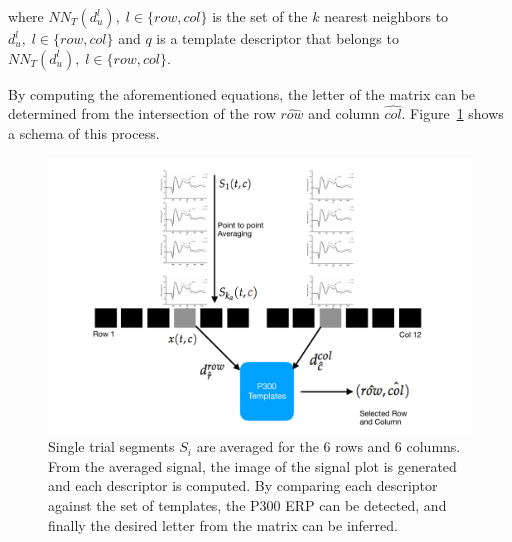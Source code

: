 \documentclass[entropy,article,submit,moreauthors,pdftex,10pt,a4paper]{mdpi}
\begin{document}
\begin{enumerate}
where $NN_T(d^l_u), \;l\in\{row,{col}\}$ is the set of the $k$ nearest neighbors to $d^l_u, \;l\in\{row,{col}\}$ and $q$ is a template descriptor that belongs to $NN_T(d^l_u), \;l\in\{row,{col}\}$.  


\end{enumerate}
By computing the aforementioned equations, the letter of the matrix can be determined from the intersection of the row $ \hat{row} $ and column $ \hat{col} $. 
Figure~\ref{fig:classification} shows a schema of this process. 
\begin{figure}[htp]
\centering
\includegraphics[width=15cm]{classificationgraph.pdf}
\caption{Single trial segments $S_i$ are averaged for the 6 rows and 6 columns. From the averaged signal, the image of the signal plot is generated and each descriptor is computed.  By comparing each descriptor against the set of templates, the P300 ERP can be detected, and finally the desired letter from the matrix can be inferred.}
\label{fig:classification}
\end{figure}
\end{document}
